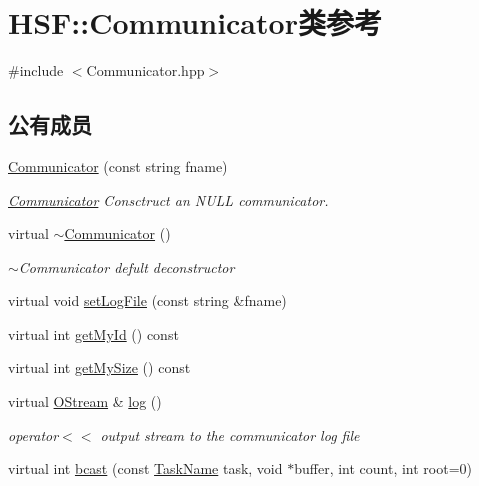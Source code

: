 \hypertarget{classHSF_1_1Communicator}{
\section{HSF::Communicator类参考}
\label{classHSF_1_1Communicator}
}


{\ttfamily \#include $<$Communicator.hpp$>$}\subsection*{公有成员}
\begin{DoxyCompactItemize}
\item 
\hyperlink{classHSF_1_1Communicator_a3d860a8bbf699d64805747144fc4e53b}{Communicator} (const string fname)
\begin{DoxyCompactList}\small\item\em \hyperlink{classHSF_1_1Communicator}{Communicator} Consctruct an NULL communicator. \item\end{DoxyCompactList}\item 
virtual \hyperlink{classHSF_1_1Communicator_a3cd6eb9e85605b89e7763246aac70bb0}{$\sim$Communicator} ()
\begin{DoxyCompactList}\small\item\em $\sim$Communicator defult deconstructor \item\end{DoxyCompactList}\item 
virtual void \hyperlink{classHSF_1_1Communicator_a0c67eacadd200a1f385bf1487561d05d}{setLogFile} (const string \&fname)
\item 
virtual int \hyperlink{classHSF_1_1Communicator_a49da303dc707182ac09c2021a7b36619}{getMyId} () const 
\item 
virtual int \hyperlink{classHSF_1_1Communicator_a064ce6664bdb8aaff6ddd1db54bd10ab}{getMySize} () const 
\item 
virtual \hyperlink{classHSF_1_1OStream}{OStream} \& \hyperlink{classHSF_1_1Communicator_a80806fd26dfa925ef6fb55cee2cb74f5}{log} ()
\begin{DoxyCompactList}\small\item\em operator$<$$<$ output stream to the communicator log file \item\end{DoxyCompactList}\item 
virtual int \hyperlink{classHSF_1_1Communicator_a936cbdaf86f7ff982c50b17d1958051c}{bcast} (const \hyperlink{namespaceHSF_a928eb958edfcd09f62de19e9cd3bac70}{TaskName} task, void $\ast$buffer, int count, int root=0)

\end{DoxyCompactItemize}
